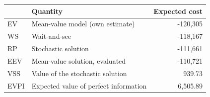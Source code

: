 \begin{tabular}{llr}
\toprule
 & Quantity & Expected cost \\
\midrule
EV & Mean-value model (own estimate) & -120,305 \\
WS & Wait-and-see & -118,167 \\
RP & Stochastic solution & -111,661 \\
EEV & Mean-value solution, evaluated & -110,721 \\
VSS & Value of the stochastic solution & 939.73 \\
EVPI & Expected value of perfect information & 6,505.89 \\
\bottomrule
\end{tabular}
